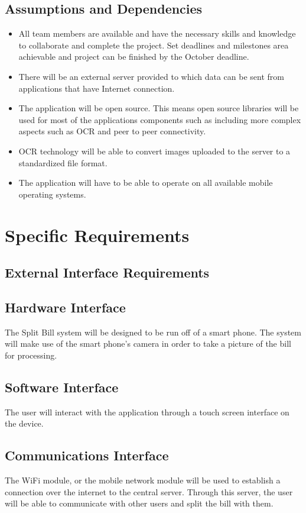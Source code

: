 \documentclass[12pt,a4paper]{article}
\begin{document}
   	\subsection{Assumptions and Dependencies}
		 \begin{itemize}
	\item All team members are available and have the necessary skills and knowledge to collaborate and complete the project. 
Set deadlines and milestones area achievable and project can be finished by the October deadline.   
\item There will be an external server provided to which data can be sent from applications that have Internet connection. 
\item The application will be open source. This means open source libraries will be used for most of the applications components such as including more complex aspects such as OCR and peer to peer connectivity. 
\item OCR technology will be able to convert images uploaded to the server to a standardized file format.
\item The application will have to be able to operate on all available mobile operating systems. 
\end{itemize}
   \section{Specific Requirements}
	\subsection{External Interface Requirements}
		\subsection{Hardware Interface}
		The Split Bill system will be designed to be run off of a smart phone. The system will make use of the smart phone's camera in order to take a picture of the bill for processing.
		\subsection{Software Interface}
		The user will interact with the application through a touch screen interface on the device. 
		\subsection{Communications Interface}
		The WiFi module, or the mobile network module will be used to establish a connection over the internet to the central server. Through this server, the user will be able to communicate with other users and split the bill with them.
\end{document}
